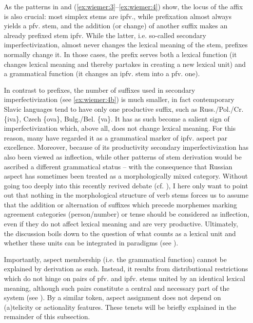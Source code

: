 \documentclass[output=paper]{langscibook}
\begin{document}
As the patterns in  and (\ref{ex:wiemer:3}--\ref{ex:wiemer:4}) show, the locus of the affix is also crucial: most simplex stems are ipfv., while prefixation almost always yields a pfv. stem, and the addition (or change) of another suffix makes an already prefixed stem ipfv. While the latter, i.e. so-called secondary imperfectivization, almost never changes the lexical meaning of the stem, prefixes normally change it. In those cases, the prefix serves both a lexical function (it changes lexical meaning and thereby partakes in creating a new lexical unit) and a grammatical function (it changes an ipfv. stem into a pfv. one).

In contrast to prefixes, the number of suffixes used in secondary imperfectivization (see \ref{ex:wiemer:4b}) is much smaller, in fact contemporary Slavic languages tend to have only one productive suffix, such as Russ./Pol./Cr. \{iva\}, Czech \{ova\}, Bulg.\slash Bel. \{va\}. It has as such become a salient sign of imperfectivization which, above all, does not change lexical meaning. For this reason, many have regarded it as a grammatical marker of ipfv. aspect par excellence. Moreover, because of its productivity secondary imperfectivization has also been viewed as inflection, while other patterns of stem derivation would be ascribed a different grammatical status – with the consequence that Russian aspect has sometimes been treated as a morphologically mixed category. Without going too deeply into this recently revived debate (cf. \citealt{Gorbova2015}), I here only want to point out that nothing in the morphological structure of verb stems forces us to assume that the addition or alternation of suffixes which precede morphemes marking agreement categories (person/number) or tense should be considered as inflection, even if they do not affect lexical meaning and are very productive. Ultimately, the discussion boils down to the question of what counts as a lexical unit and whether these units can be integrated in paradigms (see ).

Importantly, aspect membership (i.e. the grammatical function) cannot be explained by derivation as such. Instead, it results from distributional restrictions which do not hinge on pairs of pfv. and ipfv. stems united by an identical lexical meaning, although such pairs constitute a central and necessary part of the system (see ). By a similar token, aspect assignment does not depend on (a)telicity or actionality features. These tenets will be briefly explained in the remainder of this subsection.
\end{document}
